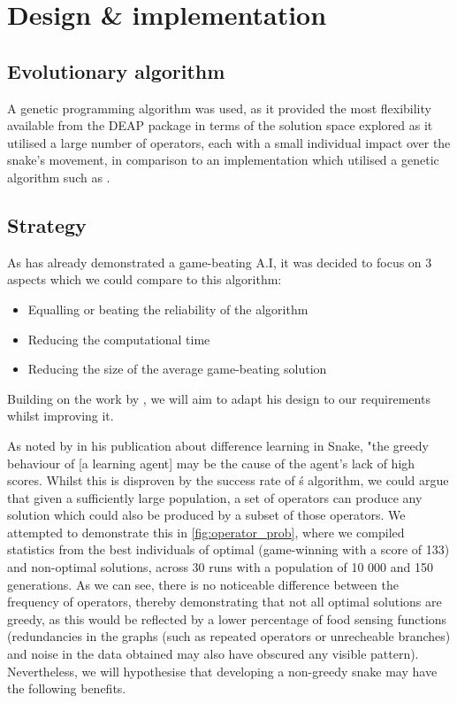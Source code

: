 \documentclass[british,10pt,a4paper]{article}
\begin{document}
\section{Design \& implementation}
\subsection{Evolutionary algorithm}
A genetic programming algorithm was used, as it provided the most flexibility available from the DEAP package in terms of the solution space explored as it utilised a large number of operators, each with a small individual impact over the snake's movement, in comparison to an implementation which utilised a genetic algorithm such as \citet{Yeh2016-ts}.

\subsection{Strategy}
As \citet{Ehlis2000-sz} has already demonstrated a game-beating A.I, it was decided to focus on 3 aspects which we could compare to this algorithm:
\begin{itemize}
	\item Equalling or beating the reliability of the algorithm
	\item Reducing the computational time
	\item Reducing the size of the average game-beating solution
\end{itemize}
Building on the work by \citeauthor{Ehlis2000-sz}, we will aim to adapt his design to our requirements whilst improving it. \newline

As noted by \citet{Christopher_Lockhart2010-em} in his publication about difference learning in Snake, "the greedy behaviour of [a learning agent] may be the cause of the agent's lack of high scores. Whilst this is disproven by the success rate of \citeauthor{Ehlis2000-sz}\'s algorithm, we could argue that given a sufficiently large population, a set of operators can produce any solution which could also be produced by a subset of those operators. We attempted to demonstrate this in \autoref{fig:operator_prob}, where we compiled statistics from the best individuals of optimal (game-winning with a score of 133) and non-optimal solutions, across 30 runs with a population of 10 000 and 150 generations. As we can see, there is no noticeable difference between the frequency of operators, thereby demonstrating that not all optimal solutions are greedy, as this would be reflected by a lower percentage of food sensing functions (redundancies in the graphs (such as repeated operators or unrecheable branches) and noise in the data obtained may also have obscured any visible pattern). Nevertheless, we will hypothesise that developing a non-greedy snake may have the following benefits.
\end{document}
